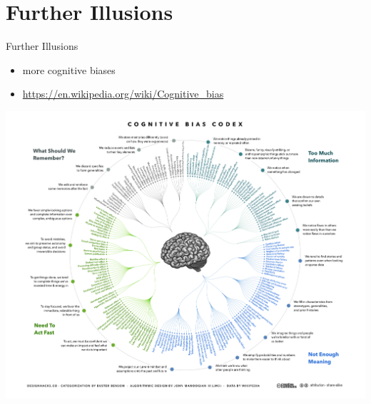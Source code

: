 \documentclass{ercisbeamer}
\begin{document}
\section{Further Illusions}
\begin{frame}{Further Illusions}
    \begin{itemize}
        \item {} more cognitive biases
        \item \url{https://en.wikipedia.org/wiki/Cognitive_bias}
    \end{itemize}
    \centering
    \includegraphics[width=.45\paperwidth]{02_resources/cognitive_bias_codex.png}
\end{frame}
\end{document}
